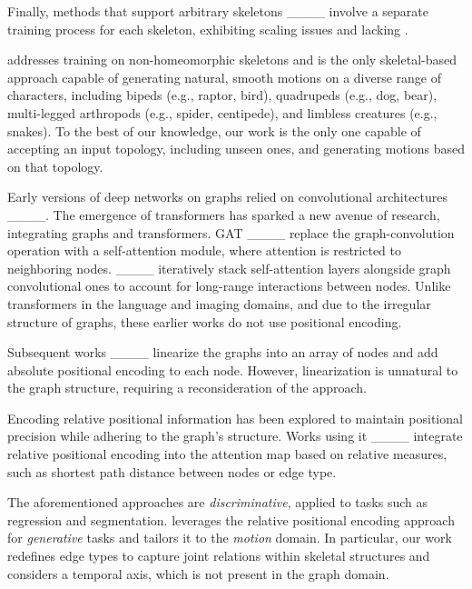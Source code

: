 Finally, methods that support arbitrary skeletons ____ involve a separate training process for each skeleton, exhibiting scaling issues and lacking \Crossgen.

\algoname addresses training on non-homeomorphic skeletons and is the only skeletal-based approach capable of generating natural, smooth motions on a diverse range of characters, including bipeds (e.g., raptor, bird), quadrupeds (e.g., dog, bear), multi-legged arthropods (e.g., spider, centipede), and limbless creatures (e.g., snakes). To the best of our knowledge, our work is the only one capable of accepting an input topology, including unseen ones, and generating motions based on that topology.









Early versions of deep networks on graphs relied on convolutional architectures ____. The emergence of transformers has sparked a new avenue of research, integrating graphs and transformers.
GAT ____
replace the graph-convolution operation with a self-attention module, where attention is restricted to neighboring nodes. ____ iteratively stack self-attention layers alongside graph convolutional ones to account for long-range interactions between nodes.
Unlike transformers in the language and imaging domains, and due to the irregular structure of graphs, these earlier works do not use positional encoding.

Subsequent works ____ linearize the graphs into an array of nodes and add absolute positional encoding to each node.
However, linearization is unnatural to the graph structure, requiring a reconsideration of the approach.

Encoding relative positional information has been explored to maintain positional precision while adhering to the graph's structure. Works using it ____ integrate relative positional encoding into the attention map based on relative measures, such as shortest path distance between nodes or edge type.

The aforementioned approaches are \emph{discriminative}, applied to tasks such as regression and segmentation.
\algoname leverages the relative positional encoding approach for \emph{generative} tasks and tailors it to the \emph{motion}
domain. In particular, our work redefines edge types to capture joint relations within skeletal structures and considers a temporal axis, which is not present in the graph domain.